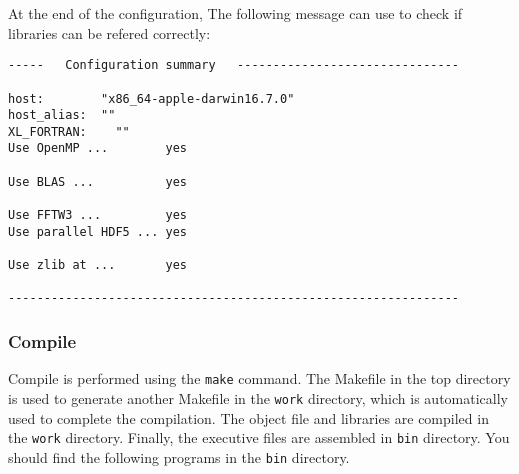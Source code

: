 At the end of the configuration, The following message can use to check if libraries can be refered correctly:

{\small
\begin{verbatim}
-----   Configuration summary   -------------------------------

host:        "x86_64-apple-darwin16.7.0"
host_alias:  ""
XL_FORTRAN:    ""
Use OpenMP ...        yes

Use BLAS ...          yes

Use FFTW3 ...         yes
Use parallel HDF5 ... yes

Use zlib at ...       yes

---------------------------------------------------------------
\end{verbatim}
}


\subsubsection{Compile}
Compile is performed using the {\tt make} command. The Makefile in the top directory is used to generate another Makefile in the {\tt work} directory, which is automatically used to complete the compilation. The object file and libraries are compiled in the {\tt work} directory. Finally, the executive files are assembled in {\tt bin} directory. You should find the following programs in the {\tt bin} directory.
%
